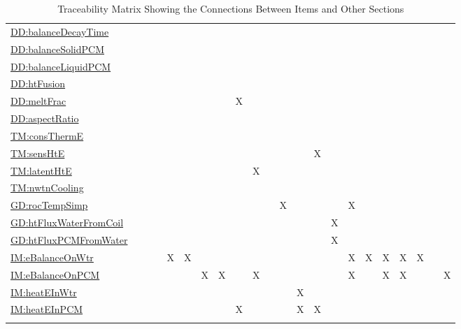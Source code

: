 \documentclass[12pt]{article}
\begin{document}
\begin{longtable}{l l l l l l l l l l l l l l l l l l l l l l}
\\
\hyperref[DD:balanceDecayTime]{DD:balanceDecayTime} &  &  &  &  &  &  &  &  &  &  &  &  &  &  &  &  &  &  &  &  & 
\\
\hyperref[DD:balanceSolidPCM]{DD:balanceSolidPCM} &  &  &  &  &  &  &  &  &  &  &  &  &  &  &  &  &  &  &  &  & 
\\
\hyperref[DD:balanceLiquidPCM]{DD:balanceLiquidPCM} &  &  &  &  &  &  &  &  &  &  &  &  &  &  &  &  &  &  &  &  & 
\\
\hyperref[DD:htFusion]{DD:htFusion} &  &  &  &  &  &  &  &  &  &  &  &  &  &  &  &  &  &  &  &  & 
\\
\hyperref[DD:meltFrac]{DD:meltFrac} &  &  &  &  &  &  &  & X &  &  &  &  &  &  &  &  &  &  &  &  & 
\\
\hyperref[DD:aspectRatio]{DD:aspectRatio} &  &  &  &  &  &  &  &  &  &  &  &  &  &  &  &  &  &  &  &  & 
\\
\hyperref[TM:consThermE]{TM:consThermE} &  &  &  &  &  &  &  &  &  &  &  &  &  &  &  &  &  &  &  &  & 
\\
\hyperref[TM:sensHtE]{TM:sensHtE} &  &  &  &  &  &  &  &  &  &  &  &  & X &  &  &  &  &  &  &  & 
\\
\hyperref[TM:latentHtE]{TM:latentHtE} &  &  &  &  &  &  &  &  & X &  &  &  &  &  &  &  &  &  &  &  & 
\\
\hyperref[TM:nwtnCooling]{TM:nwtnCooling} &  &  &  &  &  &  &  &  &  &  &  &  &  &  &  &  &  &  &  &  & 
\\
\hyperref[GD:rocTempSimp]{GD:rocTempSimp} &  &  &  &  &  &  &  &  &  &  & X &  &  &  & X &  &  &  &  &  & 
\\
\hyperref[GD:htFluxWaterFromCoil]{GD:htFluxWaterFromCoil} &  &  &  &  &  &  &  &  &  &  &  &  &  & X &  &  &  &  &  &  & 
\\
\hyperref[GD:htFluxPCMFromWater]{GD:htFluxPCMFromWater} &  &  &  &  &  &  &  &  &  &  &  &  &  & X &  &  &  &  &  &  & 
\\
\hyperref[IM:eBalanceOnWtr]{IM:eBalanceOnWtr} &  &  &  & X & X &  &  &  &  &  &  &  &  &  & X & X & X & X & X &  & 
\\
\hyperref[IM:eBalanceOnPCM]{IM:eBalanceOnPCM} &  &  &  &  &  & X & X &  & X &  &  &  &  &  & X &  & X & X &  &  & X
\\
\hyperref[IM:heatEInWtr]{IM:heatEInWtr} &  &  &  &  &  &  &  &  &  &  &  & X &  &  &  &  &  &  &  &  & 
\\
\hyperref[IM:heatEInPCM]{IM:heatEInPCM} &  &  &  &  &  &  &  & X &  &  &  & X & X &  &  &  &  &  &  &  & 
\\
\bottomrule
\caption{Traceability Matrix Showing the Connections Between Items and Other Sections}
\label{Table:TraceMatRefvsRef}
\end{longtable}
\end{document}
